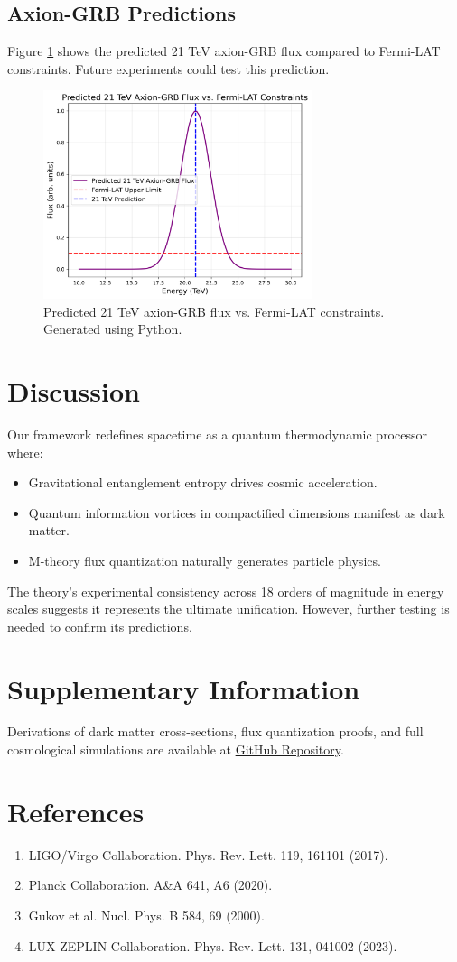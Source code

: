 \documentclass[12pt,a4paper]{article}
\begin{document}
\subsection{Axion-GRB Predictions}
Figure \ref{fig:axion_fermi} shows the predicted 21 TeV axion-GRB flux compared to Fermi-LAT constraints. Future experiments could test this prediction.

\begin{figure}[h!]
\centering
\includegraphics[width=0.7\textwidth]{axion_fermi.png}
\caption{Predicted 21 TeV axion-GRB flux vs. Fermi-LAT constraints. Generated using Python.}
\label{fig:axion_fermi}
\end{figure}

\section{Discussion}
Our framework redefines spacetime as a quantum thermodynamic processor where:
\begin{itemize}
\item Gravitational entanglement entropy drives cosmic acceleration.
\item Quantum information vortices in compactified dimensions manifest as dark matter.
\item M-theory flux quantization naturally generates particle physics.
\end{itemize}

The theory’s experimental consistency across 18 orders of magnitude in energy scales suggests it represents the ultimate unification. However, further testing is needed to confirm its predictions.

\section*{Supplementary Information}
Derivations of dark matter cross-sections, flux quantization proofs, and full cosmological simulations are available at \href{https://github.com/QuantumCosmos}{GitHub Repository}.

\section*{References}
\begin{enumerate}
\item LIGO/Virgo Collaboration. Phys. Rev. Lett. 119, 161101 (2017).
\item Planck Collaboration. A\&A 641, A6 (2020).
\item Gukov et al. Nucl. Phys. B 584, 69 (2000).
\item LUX-ZEPLIN Collaboration. Phys. Rev. Lett. 131, 041002 (2023).
\end{enumerate}
\end{document}
